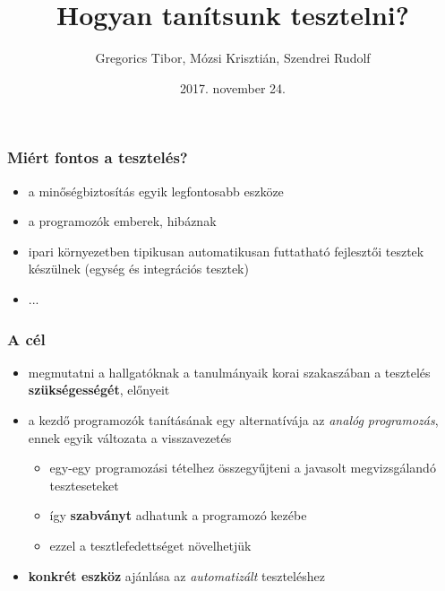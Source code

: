 \documentclass[11pt]{beamer}
\author{Gregorics Tibor, Mózsi Krisztián, Szendrei Rudolf}
\title{Hogyan tanítsunk tesztelni?}
\date{2017. november 24.}
\begin{document}
\begin{frame}
\titlepage
\end{frame}


\begin{frame}
	\frametitle{Miért fontos a tesztelés?}
	\begin{itemize}
		\item a minőségbiztosítás egyik legfontosabb eszköze
		\vspace*{2px}
		\item a programozók emberek, hibáznak %
		\vspace*{2px}
		\item ipari környezetben tipikusan automatikusan futtatható fejlesztői tesztek készülnek (egység és integrációs tesztek)
		\vspace*{2px}
		\item ...
	\end{itemize}
\end{frame}

\begin{frame}
	\frametitle{A cél}
	\begin{itemize}

		\item megmutatni a hallgatóknak a tanulmányaik korai szakaszában a tesztelés \textbf{szükségességét}, előnyeit 
		\vspace*{8px}
		\item a kezdő programozók tanításának egy alternatívája az \textit{analóg programozás}, ennek egyik változata a visszavezetés
			\begin{itemize}
				\item egy-egy programozási tételhez összegyűjteni a javasolt megvizsgálandó teszteseteket 
				\item így \textbf{szabványt} adhatunk a programozó kezébe 
				\item ezzel a tesztlefedettséget növelhetjük 
			\end{itemize} 
		\vspace*{8px}
		\item \textbf{konkrét eszköz} ajánlása az \textit{automatizált} teszteléshez
		
	\end{itemize}
\end{frame}
\end{document}

